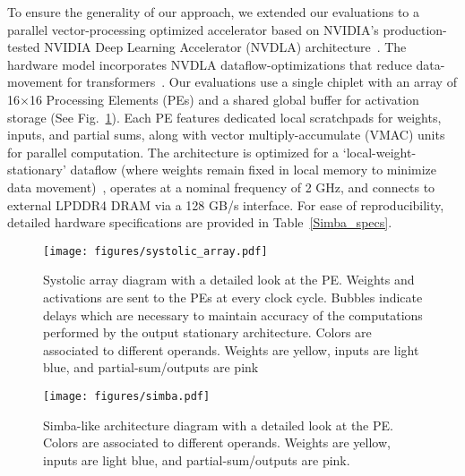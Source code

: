 To ensure the generality of our approach, we extended our evaluations to a parallel vector-processing optimized accelerator based on NVIDIA's production-tested NVIDIA Deep Learning Accelerator (NVDLA) architecture~\cite{nvdla, simba}. The hardware model incorporates NVDLA dataflow-optimizations that reduce data-movement for transformers~\cite{nvidia_xformer}. Our evaluations use a single chiplet with an array of 16$\times$16 Processing Elements (PEs) and a shared global buffer for activation storage (See Fig.~\ref{fig:simba-like_arch_diagram}). Each PE features dedicated local scratchpads for weights, inputs, and partial sums, along with vector multiply-accumulate (VMAC) units for parallel computation. The architecture is optimized for a `local-weight-stationary' dataflow (where weights remain fixed in local memory to minimize data movement)~\cite{magnet}, operates at a nominal frequency of 2 GHz, and connects to external LPDDR4 DRAM via a 128 GB/s interface. For ease of reproducibility, detailed hardware specifications are provided in Table~\ref{Simba_specs}.


\begin{figure}[h] %
    \centering
    \texttt{[image: figures/systolic\_array.pdf]} %
    \caption{Systolic array diagram with a detailed look at the PE. Weights and activations are sent to the PEs at every clock cycle. Bubbles indicate delays which are necessary to maintain accuracy of the computations performed by the output stationary architecture. Colors are associated to different operands. Weights are yellow, inputs are light blue, and partial-sum/outputs are pink}
    \label{fig:systolic_array_diagram}

    \vspace{1em} %

    \texttt{[image: figures/simba.pdf]} %
    \caption{Simba-like architecture diagram with a detailed look at the PE. Colors are associated to different operands. Weights are yellow, inputs are light blue, and partial-sum/outputs are pink.}
    \label{fig:simba-like_arch_diagram}
\end{figure}



